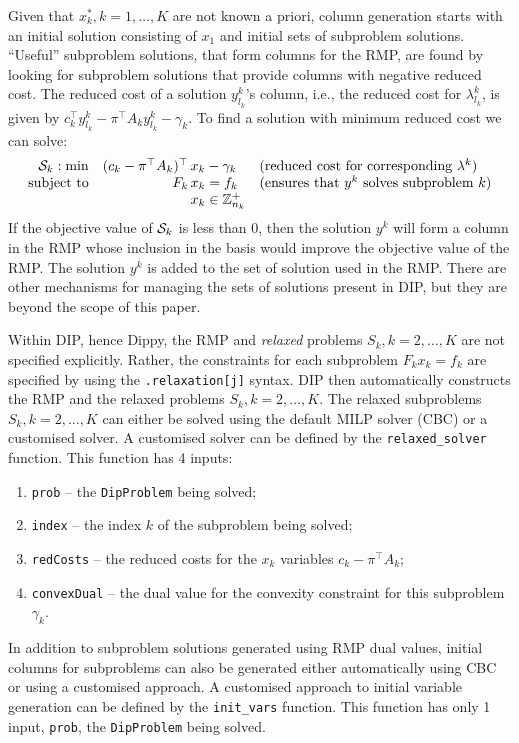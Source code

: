 Given that $x^*_k, k = 1, \ldots, K$ are not known a priori, column generation starts with an initial solution consisting of $x_1$ and initial sets of subproblem solutions. ``Useful'' subproblem solutions, that form columns for the RMP, are found by looking for subproblem solutions that provide columns with negative reduced cost. The reduced cost of a solution $y^k_{l_k}$'s column, i.e., the reduced cost for $\lambda^k_{l_k}$,  is given by $c_k^\top y^k_{l_k} - \pi^\top A_k y^k_{l_k} - \gamma_k$. To find a solution with minimum reduced cost we can solve:
\begin{equation}
\begin{array}{rr@{\,}ll}
{\cal S}_k: \min & (c_k - \pi^\top A_k)^\top &x_k - \gamma_k & \text{(reduced cost for corresponding $\lambda^k$)} \\
\text{subject to} & F_k & x_k      = f_k & \text{(ensures that $y^k$ solves subproblem $k$)} \\
                  & & x_k \in \mathbb{Z}^{+}_{n_k}
\end{array}
\label{eqn:subprob}
\end{equation}
If the objective value of ${\cal S}_k$ is less than $0$, then the solution $y^k$ will form a column in the RMP whose inclusion in the basis would improve the objective value of the RMP. The solution $y^k$ is added to the set of solution used in the RMP. There are other mechanisms for managing the sets of solutions present in \ac{DIP}, but they are beyond the scope of this paper.

Within \ac{DIP}, hence Dippy, the RMP and \textit{relaxed} problems $S_k, k = 2, \ldots, K$ are not specified explicitly. Rather, the constraints for each subproblem $F_k x_k = f_k$ are specified by using the \lstinline{.relaxation[j]} syntax. \ac{DIP} then automatically constructs the RMP and the relaxed problems $S_k, k = 2, \ldots, K$. The relaxed subproblems $S_k, k = 2, \ldots, K$ can either be solved using the default \ac{MILP} solver (CBC) or a customised solver. A customised solver can be defined by the \lstinline{relaxed_solver} function.
This function has 4 inputs:
\begin{enumerate}
\item \lstinline{prob} -- the \lstinline{DipProblem} being solved;
\item \lstinline{index} -- the index $k$ of the subproblem being solved;
\item \lstinline{redCosts} -- the reduced costs for the $x_k$ variables $c_k - \pi^\top A_k$;
\item \lstinline{convexDual} -- the dual value for the convexity constraint for this subproblem $\gamma_k$.
\end{enumerate}
In addition to subproblem solutions generated using RMP dual values, initial columns for subproblems can also be generated either automatically using CBC or using a customised approach.
A customised approach to initial variable generation can be defined by the \lstinline{init_vars} function.
This function has only 1 input, \lstinline{prob}, the \lstinline{DipProblem} being solved.

